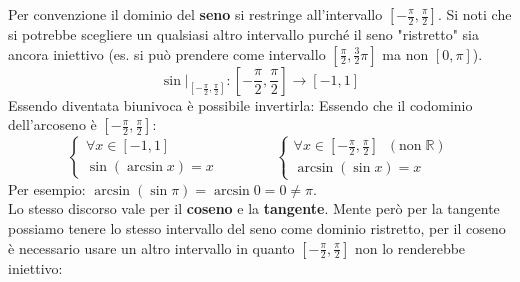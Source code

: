 Per convenzione il dominio del \textbf{seno} si restringe all'intervallo $[-\frac{\pi}{2}, \frac{\pi}{2}]$. Si noti che si potrebbe scegliere un qualsiasi altro intervallo purché il seno "ristretto" sia ancora iniettivo (es. si può prendere come intervallo $[\frac{\pi}{2}, \frac{3}{2}\pi]$ ma non $[0, \pi]$).
\begin{equation*}
    \sin |_{[-\frac{\pi}{2}, \frac{\pi}{2}]}: [-\frac{\pi}{2}, \frac{\pi}{2}] \to [-1, 1]
\end{equation*}
Essendo diventata biunivoca è possibile invertirla:
Essendo che il codominio dell'arcoseno è $[-\frac{\pi}{2}, \frac{\pi}{2}]$:
\begin{equation*}
    \begin{cases}
        \forall x \in [-1, 1]\\
        \sin(\arcsin{x}) = x
    \end{cases}
    \qquad \qquad
    \begin{cases}
        \forall x \in [-\frac{\pi}{2}, \frac{\pi}{2}] \;\;(\mathrm{non}\; \mathbb{R})\\
        \arcsin(\sin{x}) = x
    \end{cases}
\end{equation*}
Per esempio: $\arcsin(\sin{\pi}) = \arcsin{0} = 0 \neq \pi$.\\

Lo stesso discorso vale per il \textbf{coseno} e la \textbf{tangente}. Mente però per la tangente possiamo tenere lo stesso intervallo del seno come dominio ristretto, per il coseno è necessario usare un altro intervallo in quanto $[-\frac{\pi}{2}, \frac{\pi}{2}]$ non lo renderebbe iniettivo:

